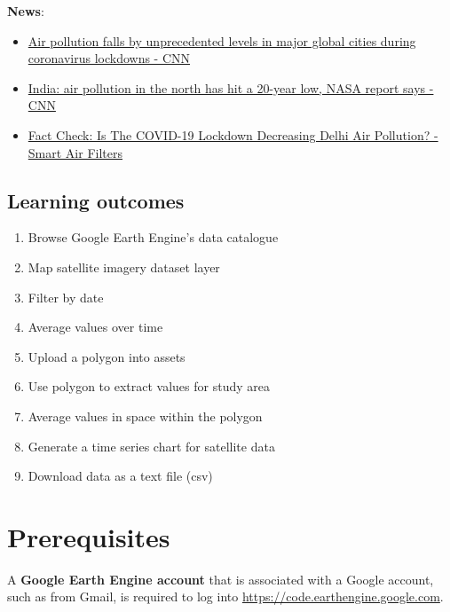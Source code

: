 \documentclass[]{book}
\providecommand{\tightlist}{%
  \setlength{\itemsep}{0pt}\setlength{\parskip}{0pt}}
\begin{document}
\textbf{News}:

\begin{itemize}
\tightlist
\item
  \href{https://www.cnn.com/2020/04/22/world/air-pollution-reduction-cities-coronavirus-intl-hnk/index.html}{Air pollution falls by unprecedented levels in major global cities during coronavirus lockdowns - CNN}
\item
  \href{https://www.cnn.com/2020/04/23/india/india-air-pollution-coronavirus-nasa-intl/index.html}{India: air pollution in the north has hit a 20-year low, NASA report says - CNN}
\item
  \href{https://smartairfilters.com/en/blog/delhi-pm25-air-pollution-decrease-coronavirus/}{Fact Check: Is The COVID-19 Lockdown Decreasing Delhi Air Pollution? - Smart Air Filters}
\end{itemize}

\hypertarget{learning-outcomes}{%
\subsection*{Learning outcomes}\label{learning-outcomes}}

\begin{enumerate}
\def\labelenumi{\arabic{enumi}.}
\tightlist
\item
  Browse Google Earth Engine's data catalogue
\item
  Map satellite imagery dataset layer
\item
  Filter by date
\item
  Average values over time
\item
  Upload a polygon into assets
\item
  Use polygon to extract values for study area
\item
  Average values in space within the polygon
\item
  Generate a time series chart for satellite data
\item
  Download data as a text file (csv)
\end{enumerate}

\hypertarget{prerequisites-1}{%
\section*{Prerequisites}\label{prerequisites-1}}

A \textbf{Google Earth Engine account} that is associated with a Google account, such as from Gmail, is required to log into \url{https://code.earthengine.google.com}.
\end{document}
